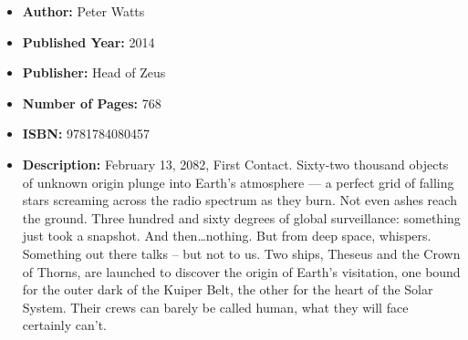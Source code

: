 \documentclass{tufte-handout}
\begin{document}
\begin{itemize}
    \item[] \textbf{Author:} Peter Watts
    \item[] \textbf{Published Year:} 2014
    \item[] \textbf{Publisher:} Head of Zeus
    \item[] \textbf{Number of Pages:} 768      
    \item[] \textbf{ISBN:} 9781784080457
    \item[] \textbf{Description:} February 13, 2082, First Contact. Sixty-two thousand objects of unknown origin plunge into Earth's atmosphere --- a perfect grid of falling stars screaming across the radio spectrum as they burn. Not even ashes reach the ground. Three hundred and sixty degrees of global surveillance: something just took a snapshot. And then\ldots nothing. But from deep space, whispers. Something out there talks – but not to us. Two ships, Theseus and the Crown of Thorns, are launched to discover the origin of Earth's visitation, one bound for the outer dark of the Kuiper Belt, the other for the heart of the Solar System. Their crews can barely be called human, what they will face certainly can't.
\end{itemize}
\end{document}
